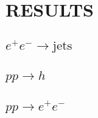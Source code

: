 \section{RESULTS}
\label{sec:psunc:results}

\subsection{$e^+e^-\to\text{jets}$}
\label{sec:psunc:results:ee}

\subsection{$pp\to h$}
\label{sec:psunc:results:h}

\subsection{$pp\to e^+e^-$}
\label{sec:psunc:results:dy}
